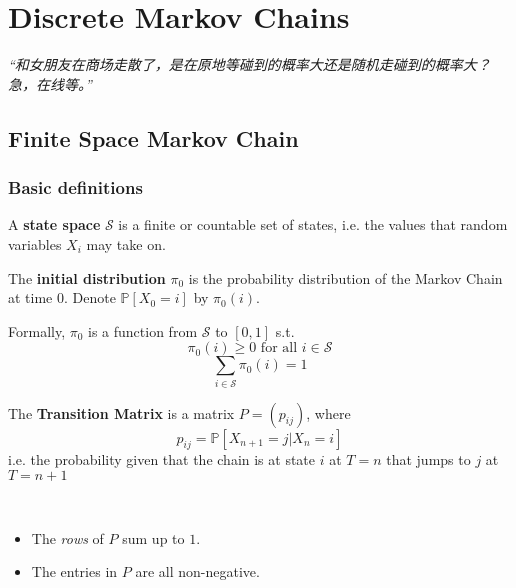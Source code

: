 \chapter{Discrete Markov Chains}
\emph{“和女朋友在商场走散了，是在原地等碰到的概率大还是随机走碰到的概率大？急，在线等。”}
\newpage


\section{Finite Space Markov Chain}

    \subsection{Basic definitions}
    \begin{definition}
        A \textbf{state space} $\mathcal{S}$ is a finite or countable set of states, i.e. the values that random variables $X_i$ may take on.
    \end{definition}
    \begin{definition}
        The \textbf{initial distribution} $\pi_0$ is the probability distribution of the Markov Chain at time $0$. Denote $\mathbb{P}[X_0 = i]$ by $\pi_0(i)$.
    \end{definition}
    \begin{remark}
        Formally, $\pi_0$ is a function from $\mathcal{S}$ to $[0,1]$ s.t.
        \[ \pi_0(i) \ge 0 \text{ for all $i\in\mathcal{S}$} \]
        \[ \sum_{i\in\mathcal{S}} \pi_0(i) = 1\]
    \end{remark}
    \begin{definition}
        The \textbf{Transition Matrix} is a matrix $P = (p_{ij})$, where
        \[ p_{ij} = \mathbb{P}[X_{n+1} = j | X_n = i] \]
        i.e. the probability given that the chain is at state $i$ at $T=n$ that jumps to $j$ at $T=n+1$
    \end{definition}
    \begin{remark}
        ~{}
        \begin{itemize}
            \item The \emph{rows} of $P$ sum up to $1$.
            \item The entries in $P$ are all non-negative.
        \end{itemize}
    \end{remark}

